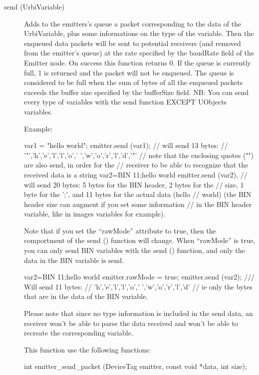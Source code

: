 \noindent
\begin{description}
\item[{send (UrbiVariable)}] Adds to the emitters's queue a packet
  corresponding to the data of the UrbiVariable, plus some
  informations on the type of the variable. Then the enqueued data
  packets will be sent to potential receivers (and removed from the
  emitter's queue) at the rate specified by the baudRate field of the
  Emitter node. On success this function returns 0. If the queue is
  currently full, 1 is returned and the packet will not be
  enqueued. The queue is considered to be full when the sum of bytes
  of all the enqueued packets exceeds the buffer size specified by the
  bufferSize field.  NB: You can send every type of \urbi variables
  with the send function EXCEPT UObjects variables.


  Example:


\begin{urbiunchecked}
var1 = "hello world";
emitter.send (var1);
// will send 13 bytes:
// '"','h','e','l','l','o',' ','w','o','r','l','d','"'
// note that the enclosing quotes ("") are also send, in order for the
// receiver to be able to recognize that the received data is a string
var2=BIN 11;hello world
emitter.send (var2),
// will send 20 bytes: 5 bytes for the BIN header, 2 bytes for the
// size, 1 byte for the ';', and 11 bytes for the actual data (hello
// world) (the BIN header size can augment if you set some information
// in the BIN header variable, like in images variables for example).
\end{urbiunchecked}

  Note that if you set the ``rawMode'' attribute to true, then the
  comportment of the send () function will change. When ``rawMode'' is
  true, you can only send BIN variables with the send () function, and
  only the data in the BIN variable is send.


\begin{urbiunchecked}
var2=BIN 11;hello world
emitter.rawMode = true;
emitter.send (var2);
/// Will send 11 bytes:
// 'h','e','l','l','o',' ','w','o','r','l','d'
// ie only the bytes that are in the data of the BIN variable.
\end{urbiunchecked}

Please note that since no type information is included in the send
data, an \urbi receiver won't be able to parse the data received and
won't be able to recreate the corresponding \urbi variable.

This function use the following \webots functions:

\begin{cxx}
int emitter_send_packet  (DeviceTag emitter, const void *data, int size);
\end{cxx}
\end{description}

